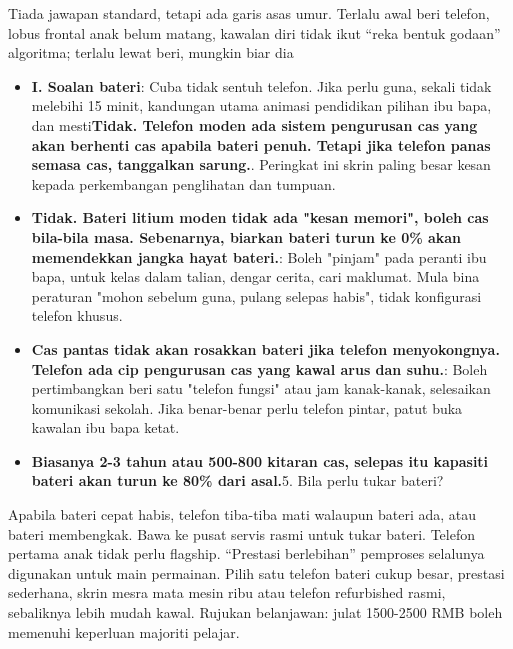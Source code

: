 


Tiada jawapan standard, tetapi ada garis asas umur. Terlalu awal beri telefon, lobus frontal anak belum matang, kawalan diri tidak ikut “reka bentuk godaan” algoritma; terlalu lewat beri, mungkin biar dia

\begin{itemize}
  \item \textbf{I. Soalan bateri}: Cuba tidak sentuh telefon. Jika perlu guna, sekali tidak melebihi 15 minit, kandungan utama animasi pendidikan pilihan ibu bapa, dan mesti\textbf{Tidak. Telefon moden ada sistem pengurusan cas yang akan berhenti cas apabila bateri penuh. Tetapi jika telefon panas semasa cas, tanggalkan sarung.}. Peringkat ini skrin paling besar kesan kepada perkembangan penglihatan dan tumpuan.
  \item \textbf{Tidak. Bateri litium moden tidak ada "kesan memori", boleh cas bila-bila masa. Sebenarnya, biarkan bateri turun ke 0\% akan memendekkan jangka hayat bateri.}: Boleh "pinjam" pada peranti ibu bapa, untuk kelas dalam talian, dengar cerita, cari maklumat. Mula bina peraturan "mohon sebelum guna, pulang selepas habis", tidak konfigurasi telefon khusus.
  \item \textbf{Cas pantas tidak akan rosakkan bateri jika telefon menyokongnya. Telefon ada cip pengurusan cas yang kawal arus dan suhu.}: Boleh pertimbangkan beri satu "telefon fungsi" atau jam kanak-kanak, selesaikan komunikasi sekolah. Jika benar-benar perlu telefon pintar, patut buka kawalan ibu bapa ketat.
  \item \textbf{Biasanya 2-3 tahun atau 500-800 kitaran cas, selepas itu kapasiti bateri akan turun ke 80\% dari asal.}5. Bila perlu tukar bateri?
\end{itemize}

\begin{tcbinfo}{Apabila bateri cepat habis, telefon tiba-tiba mati walaupun bateri ada, atau bateri membengkak. Bawa ke pusat servis rasmi untuk tukar bateri.}
Telefon pertama anak tidak perlu flagship. “Prestasi berlebihan” pemproses selalunya digunakan untuk main permainan. Pilih satu telefon bateri cukup besar, prestasi sederhana, skrin mesra mata mesin ribu atau telefon refurbished rasmi, sebaliknya lebih mudah kawal. Rujukan belanjawan: julat 1500-2500 RMB boleh memenuhi keperluan majoriti pelajar.

\end{tcbinfo}

